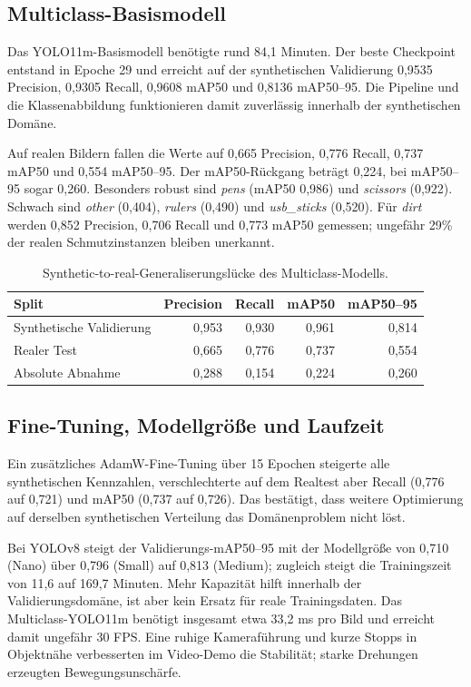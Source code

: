 \documentclass[conference,a4paper]{IEEEtran}
\begin{document}
\subsection{Multiclass-Basismodell}
Das YOLO11m-Basismodell benötigte rund 84,1 Minuten. Der beste Checkpoint entstand in Epoche 29 und erreicht auf der synthetischen Validierung 0,9535 Precision, 0,9305 Recall, 0,9608 mAP50 und 0,8136 mAP50--95. Die Pipeline und die Klassenabbildung funktionieren damit zuverlässig innerhalb der synthetischen Domäne.

Auf realen Bildern fallen die Werte auf 0,665 Precision, 0,776 Recall, 0,737 mAP50 und 0,554 mAP50--95. Der mAP50-Rückgang beträgt 0,224, bei mAP50--95 sogar 0,260. Besonders robust sind \emph{pens} (mAP50 0,986) und \emph{scissors} (0,922). Schwach sind \emph{other} (0,404), \emph{rulers} (0,490) und \emph{usb\_sticks} (0,520). Für \emph{dirt} werden 0,852 Precision, 0,706 Recall und 0,773 mAP50 gemessen; ungefähr 29\% der realen Schmutzinstanzen bleiben unerkannt.

\begin{table}[h]
\centering\small
\begin{tabular}{lrrrr}\toprule
Split & Precision & Recall & mAP50 & mAP50--95\\\midrule
Synthetische Validierung & 0,953 & 0,930 & 0,961 & 0,814\\
Realer Test & 0,665 & 0,776 & 0,737 & 0,554\\
Absolute Abnahme & 0,288 & 0,154 & 0,224 & 0,260\\\bottomrule
\end{tabular}
\caption{Synthetic-to-real-Generaliserungslücke des Multiclass-Modells.}
\end{table}

\subsection{Fine-Tuning, Modellgröße und Laufzeit}
Ein zusätzliches AdamW-Fine-Tuning über 15 Epochen steigerte alle synthetischen Kennzahlen, verschlechterte auf dem Realtest aber Recall (0,776 auf 0,721) und mAP50 (0,737 auf 0,726). Das bestätigt, dass weitere Optimierung auf derselben synthetischen Verteilung das Domänenproblem nicht löst.

Bei YOLOv8 steigt der Validierungs-mAP50--95 mit der Modellgröße von 0,710 (Nano) über 0,796 (Small) auf 0,813 (Medium); zugleich steigt die Trainingszeit von 11,6 auf 169,7 Minuten. Mehr Kapazität hilft innerhalb der Validierungsdomäne, ist aber kein Ersatz für reale Trainingsdaten. Das Multiclass-YOLO11m benötigt insgesamt etwa 33,2 ms pro Bild und erreicht damit ungefähr 30 FPS. Eine ruhige Kameraführung und kurze Stopps in Objektnähe verbesserten im Video-Demo die Stabilität; starke Drehungen erzeugten Bewegungsunschärfe.
\end{document}
